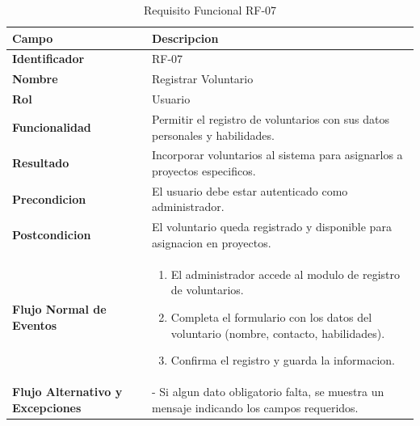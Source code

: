 \begin{table}[htb!]
\centering
\caption{Requisito Funcional RF-07}
\begin{tabular}{|p{3cm}|p{12cm}|}
\hline
\textbf{Campo} & \textbf{Descripcion} \\ \hline
\textbf{Identificador} & RF-07 \\ \hline
\textbf{Nombre} & Registrar Voluntario \\ \hline
\textbf{Rol} & Usuario \\ \hline
\textbf{Funcionalidad} & Permitir el registro de voluntarios con sus datos personales y habilidades. \\ \hline
\textbf{Resultado} & Incorporar voluntarios al sistema para asignarlos a proyectos especificos. \\ \hline
\textbf{Precondicion} & El usuario debe estar autenticado como administrador. \\ \hline
\textbf{Postcondicion} & El voluntario queda registrado y disponible para asignacion en proyectos. \\ \hline
\textbf{Flujo Normal de Eventos} & 
\begin{enumerate}
    \item El administrador accede al modulo de registro de voluntarios. 
    \item Completa el formulario con los datos del voluntario (nombre, contacto, habilidades). 
    \item Confirma el registro y guarda la informacion. 
    
\end{enumerate}
\\ \hline
\textbf{Flujo Alternativo y Excepciones} & 
- Si algun dato obligatorio falta, se muestra un mensaje indicando los campos requeridos. \\ \hline
\end{tabular}
\end{table}
\FloatBarrier

